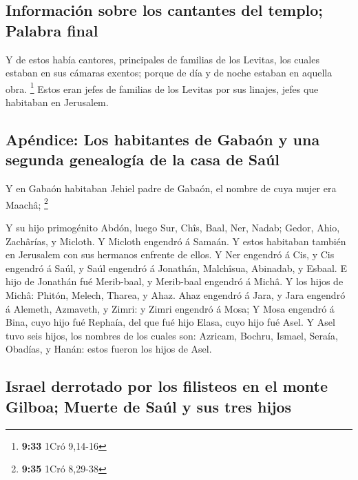 \hypertarget{informaciuxf3n-sobre-los-cantantes-del-templo-palabra-final}{%
\subsection{Información sobre los cantantes del templo; Palabra
final}\label{informaciuxf3n-sobre-los-cantantes-del-templo-palabra-final}}

 Y de estos había cantores, principales de familias de los
Levitas, los cuales estaban en sus cámaras exentos; porque de día y de
noche estaban en aquella obra. \footnote{\textbf{9:33} 1Cró 9,14-16}
 Estos eran jefes de familias de los Levitas por sus
linajes, jefes que habitaban en Jerusalem.

\hypertarget{apuxe9ndice-los-habitantes-de-gabauxf3n-y-una-segunda-genealoguxeda-de-la-casa-de-sauxfal}{%
\subsection{Apéndice: Los habitantes de Gabaón y una segunda genealogía
de la casa de
Saúl}\label{apuxe9ndice-los-habitantes-de-gabauxf3n-y-una-segunda-genealoguxeda-de-la-casa-de-sauxfal}}

 Y en Gabaón habitaban Jehiel padre de Gabaón, el nombre de
cuya mujer era Maachâ; \footnote{\textbf{9:35} 1Cró 8,29-38}

 Y su hijo primogénito Abdón, luego Sur, Chîs, Baal, Ner,
Nadab;  Gedor, Ahio, Zachârías, y Micloth.  Y
Micloth engendró á Samaán. Y estos habitaban también en Jerusalem con
sus hermanos enfrente de ellos.  Y Ner engendró á Cis, y
Cis engendró á Saúl, y Saúl engendró á Jonathán, Malchîsua, Abinadab, y
Esbaal.  E hijo de Jonathán fué Merib-baal, y Merib-baal
engendró á Michâ.  Y los hijos de Michâ: Phitón, Melech,
Tharea, y Ahaz.  Ahaz engendró á Jara, y Jara engendró á
Alemeth, Azmaveth, y Zimri: y Zimri engendró á Mosa;  Y
Mosa engendró á Bina, cuyo hijo fué Rephaía, del que fué hijo Elasa,
cuyo hijo fué Asel.  Y Asel tuvo seis hijos, los nombres de
los cuales son: Azricam, Bochru, Ismael, Seraía, Obadías, y Hanán: estos
fueron los hijos de Asel.

\hypertarget{israel-derrotado-por-los-filisteos-en-el-monte-gilboa-muerte-de-sauxfal-y-sus-tres-hijos}{%
\subsection{Israel derrotado por los filisteos en el monte Gilboa;
Muerte de Saúl y sus tres
hijos}\label{israel-derrotado-por-los-filisteos-en-el-monte-gilboa-muerte-de-sauxfal-y-sus-tres-hijos}}

